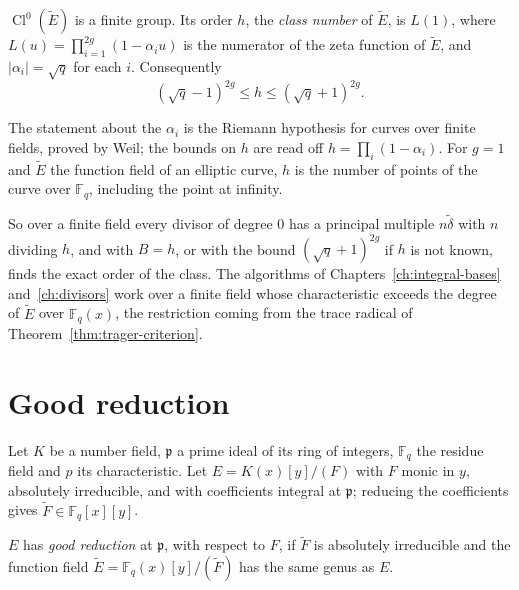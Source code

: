 \begin{theorem}\label{thm:class-number}
$\operatorname{Cl}^0(\tilde E)$ is a finite group. Its order $h$, the
\emph{class number} of $\tilde E$, is $L(1)$, where $L(u) = \prod_{i=1}^{2g}
(1 - \alpha_i u)$ is the numerator of the zeta function of $\tilde E$, and
$|\alpha_i| = \sqrt q$ for each $i$. Consequently
\[
  (\sqrt q - 1)^{2g} \le h \le (\sqrt q + 1)^{2g} .
\]
\end{theorem}

The statement about the $\alpha_i$ is the Riemann hypothesis for curves over
finite fields, proved by Weil; the bounds on $h$ are read off $h = \prod_i (1
- \alpha_i)$. For $g = 1$ and $\tilde E$ the function field of an elliptic
curve, $h$ is the number of points of the curve over $\mathbb{F}_q$,
including the point at infinity.

So over a finite field every divisor of degree $0$ has a principal multiple
$n \tilde\delta$ with $n$ dividing $h$, and  with
$B = h$, or with the bound $(\sqrt q + 1)^{2g}$ if $h$ is not known, finds the
exact order of the class. The algorithms of Chapters~\ref{ch:integral-bases}
and~\ref{ch:divisors} work over a finite field whose characteristic exceeds
the degree of $\tilde E$ over $\mathbb{F}_q(x)$, the restriction coming from the trace radical of
Theorem~\ref{thm:trager-criterion}.

\section{Good reduction}\label{sec:fo-reduction}

Let $K$ be a number field, $\mathfrak p$ a prime ideal of its ring of
integers, $\mathbb{F}_q$ the residue field and $p$ its characteristic. Let
$E = K(x)[y]/(F)$ with $F$ monic in $y$, absolutely irreducible, and with
coefficients integral at $\mathfrak p$; reducing the coefficients gives
$\tilde F \in \mathbb{F}_q[x][y]$.

\begin{definition}\label{def:good-reduction}
$E$ has \emph{good reduction} at $\mathfrak p$, with respect to $F$, if
$\tilde F$ is absolutely irreducible and the function field $\tilde E =
\mathbb{F}_q(x)[y]/(\tilde F)$ has the same genus as $E$.
\end{definition}

